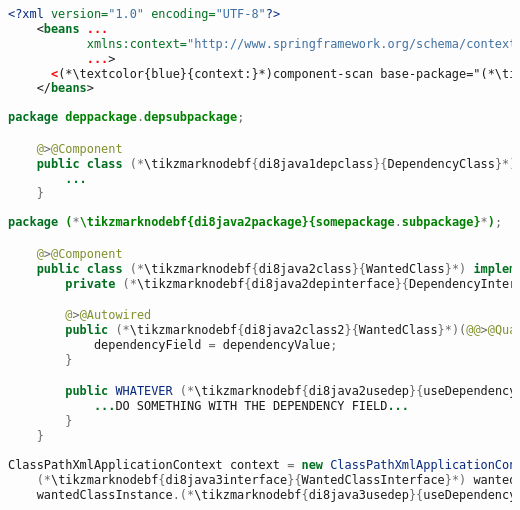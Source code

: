 \enlargethispage{20mm}
\thispagestyle{empty}
\begin{lstlisting}[language=XML, title={Configuration XML}]
    <?xml version="1.0" encoding="UTF-8"?>
    <beans ...
           xmlns:context="http://www.springframework.org/schema/context"
           ...>
      <(*\textcolor{blue}{context:}*)component-scan base-package="(*\tikzmarknodebf{di8xml1package}{somepackage.subpackage}[ForestGreen]*)"/>
    </beans>
\end{lstlisting}
\begin{lstlisting}[language=Java, title={Dependency class}]
    package deppackage.depsubpackage;

    @>@Component
    public class (*\tikzmarknodebf{di8java1depclass}{DependencyClass}*) implements (*\tikzmarknodebf{di8java1depinterface}{DependencyInterface}*) {
        ...
    }
\end{lstlisting}
\begin{lstlisting}[language=Java, title={Wanted class with the constructor}]
    package (*\tikzmarknodebf{di8java2package}{somepackage.subpackage}*);

    @>@Component
    public class (*\tikzmarknodebf{di8java2class}{WantedClass}*) implements (*\tikzmarknodebf{di8java2interface}{WantedClassInterface}*) {
        private (*\tikzmarknodebf{di8java2depinterface}{DependencyInterface}*) dependencyField;

        @>@Autowired
        public (*\tikzmarknodebf{di8java2class2}{WantedClass}*)(@@>@Qualifier<@@("(*\tikzmarknodebf{di8java2depbeanid}{dependencyClass}[ForestGreen]*)") (*\tikzmarknodebf{di8java2depinterface2}{DependencyInterface}*) dependencyValue) {
            dependencyField = dependencyValue;
        }

        public WHATEVER (*\tikzmarknodebf{di8java2usedep}{useDependency}*)() {
            ...DO SOMETHING WITH THE DEPENDENCY FIELD...
        }
    }
\end{lstlisting}
\begin{lstlisting}[language=Java, title={Usage}]
    ClassPathXmlApplicationContext context = new ClassPathXmlApplicationContext("configurationFile.xml");
    (*\tikzmarknodebf{di8java3interface}{WantedClassInterface}*) wantedClassInstance = context.getBean("(*\tikzmarknodebf{di8java3beanid}{wantedClass}[ForestGreen]*)", (*\tikzmarknodebf{di8java3interface2}{WantedClassInterface}*).class);
    wantedClassInstance.(*\tikzmarknodebf{di8java3usedep}{useDependency}*)();
\end{lstlisting}
